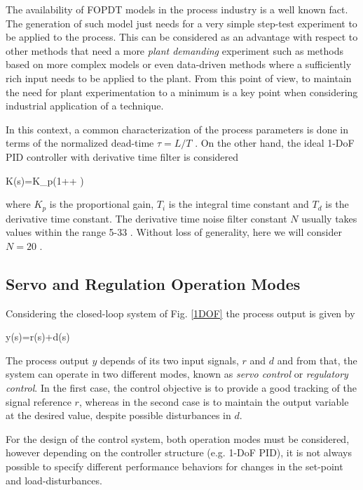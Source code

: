The availability of FOPDT models in the process industry is a well
known fact. The generation of such model just needs for a very
simple step-test experiment to be applied to the process. This can
be considered as an advantage with respect to other methods that
need a more \emph{plant demanding} experiment such as methods
based on more complex models or even data-driven methods where a
sufficiently rich input needs to be applied to the plant. From
this point of view, to maintain the need for plant experimentation
to a minimum is a key point when considering industrial
application of a technique.

In this context, a common characterization of the process
parameters is done in terms of the normalized dead-time $\tau =
L/T$ \citep{visioli2006}. On the other hand, the ideal 1-DoF PID
controller with derivative time filter is considered

\be
K(s)=K_p\left (1++ \right )
\label{pid} \ee

\noindent where $K_p$ is the proportional gain, $T_i$ is the
integral time constant and $T_d$ is the derivative time constant.
The derivative time noise filter constant $N$ usually takes values
within the range 5-33 \cite{Astrombook06,visioli2006}. Without
loss of generality, here we will consider $N=20$
\cite{zhuangAthertonIEE1993}.

\subsection{Servo and Regulation Operation Modes}

Considering the closed-loop system of Fig. \ref{1DOF} the process
output is given by

\be
y(s)=r(s)+d(s)
\label{processoutput} \ee

The process output $y$ depends of its two input signals, $r$ and
$d$ and from that, the system can operate in two different modes,
known as \emph{servo control} or \emph{regulatory control}. In the
first case, the control objective is to provide a good tracking of
the signal reference $r$, whereas in the second case is to
maintain the output variable at the desired value, despite
possible disturbances in $d$.

For the design of the control system, both operation modes must be
considered, however depending on the controller structure (e.g.
1-DoF PID), it is not always possible to specify different
performance behaviors for changes in the set-point and
load-disturbances.

